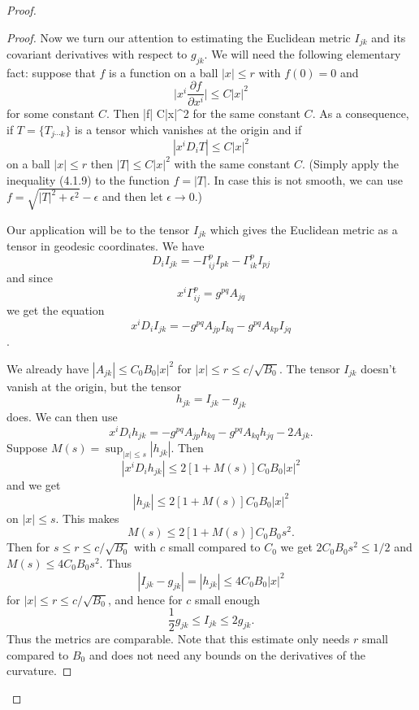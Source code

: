 \begin{proof}
\begin{proof}
Now we turn our attention to estimating the Euclidean metric
$I_{jk}$ and its covariant derivatives with respect to $g_{jk}$.
We will need the following elementary fact: suppose that $f$ is a
function on a ball $|x| \leq r$ with $f(0)=0$ and
$$
\Big| x^i \frac{\partial f}{\partial x^i} \Big| \leq C |x|^2
$$
for some constant $C$. Then \be
|f| \leq C|x|^2  %
\ee for the same constant $C$. As a consequence, if $T = \{T_{j
\cdots k }\}$ is a tensor which vanishes at the origin and if
$$
|x^iD_iT| \leq C|x|^2
$$
on a ball $|x| \leq r$ then $|T| \leq  C|x|^2$ with the same
constant $C$. (Simply apply the inequality (4.1.9) to the function
$f=|T|$. In case this is not smooth, we can use
$f=\sqrt{|T|^2+\epsilon^2}-\epsilon$ and then let $\epsilon\to
0$.)

Our application will be to the tensor $I_{jk}$ which gives the
Euclidean metric as a tensor in geodesic coordinates. We have
$$
D_iI_{jk} = - \Gamma^p_{ij}I_{pk} - \Gamma^p_{ik}I_{pj}
$$
and since
$$
x^i \Gamma^p_{ij} = g^{pq}A_{jq}
$$
we get the equation
$$
x^iD_iI_{jk} = -g^{pq}A_{jp}I_{kq}-g^{pq}A_{kp}I_{jq}
$$.

\noindent We already have $|A_{jk}| \leq C_0B_0|x|^2$ for $|x|
\leq r \leq c/ \sqrt{B_0}$. The tensor $I_{jk}$ doesn't vanish at
the origin, but the tensor
$$
h_{jk}=I_{jk}-g_{jk}
$$
does. We can then use
$$
x^iD_ih_{jk}=-g^{pq}A_{jp}h_{kq}-g^{pq}A_{kq}h_{jq}-2A_{jk}.
$$
Suppose $M(s) = \sup_{|x| \leq s}|h_{jk}|$. Then
$$
|x^iD_ih_{jk}| \leq 2[1+M(s)]C_0B_0|x|^2
$$
and we get
$$
|h_{jk}| \leq 2 [1+M(s)]C_0B_0|x|^2
$$
on $|x| \leq s$. This makes
$$
M(s) \leq 2[1+M(s)]C_0B_0s^2.
$$
Then for $s \leq r \leq c/ \sqrt{B_0}$ with $c$ small compared to
$C_0$ we get $2C_0B_0s^2 \leq 1/2$ and $M(s) \leq 4C_0B_0s^2$.
Thus
$$
|I_{jk}-g_{jk}|=|h_{jk}| \leq 4C_0B_0|x|^2
$$
for $|x| \leq r\leq c/ \sqrt{B_0}$, and hence for $c$ small enough
$$
\frac{1}{2} g_{jk} \leq I_{jk} \leq 2g_{jk}.
$$
Thus the metrics are comparable. Note that this estimate only
needs $r$ small compared to $B_0$ and does not need any bounds on
the derivatives of the curvature.


\end{proof}
\end{proof}

